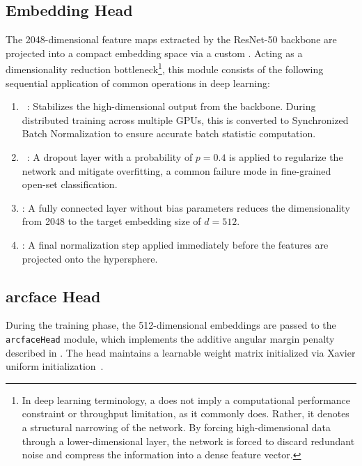 \subsection{Embedding Head}\label{sub:embedhead}
The 2048-dimensional feature maps extracted by the \ac{ResNet}-50 backbone are projected into a compact embedding space via a custom . Acting as a dimensionality reduction bottleneck\footnote{In deep learning terminology, a  does not imply a computational performance constraint or throughput limitation, as it commonly does. Rather, it denotes a structural narrowing of the network. By forcing high-dimensional data through a lower-dimensional layer, the network is forced to discard redundant noise and compress the information into a dense feature vector.}, this module consists of the following sequential application of common operations in deep learning:
\begin{enumerate}
    \item {}~\cite{ioffe2015batch}: Stabilizes the high-dimensional output from the backbone. During distributed training across multiple GPUs, this is converted to Synchronized Batch Normalization to ensure accurate batch statistic computation.
    \item {}~\cite{srivastava2014dropout}: A dropout layer with a probability of $p=0.4$ is applied to regularize the network and mitigate overfitting, a common failure mode in fine-grained open-set classification.
    \item {}: A fully connected layer without bias parameters reduces the dimensionality from 2048 to the target embedding size of $d=512$.
    \item {}: A final normalization step applied immediately before the features are projected onto the hypersphere.
\end{enumerate}

\subsection{\ac{arcface} Head}\label{sub:arcface}
During the training phase, the 512-dimensional embeddings are passed to the \texttt{\ac{arcface}Head} module, which implements the additive angular margin penalty described in . The head maintains a learnable weight matrix initialized via Xavier uniform initialization~\cite{xavier2010uniforminit}.

